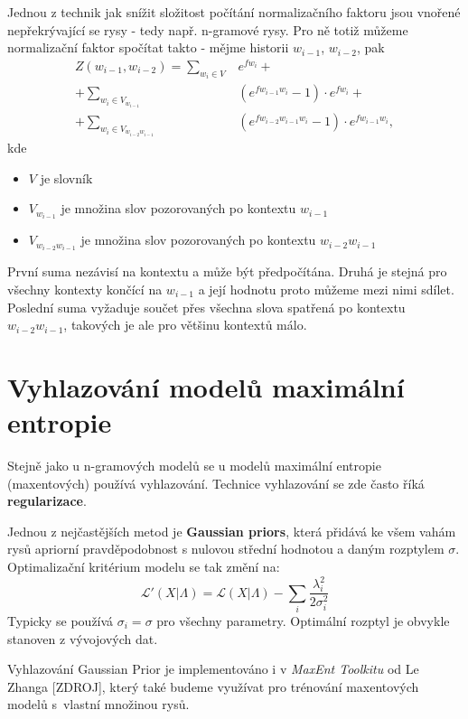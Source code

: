\documentclass[12pt,a4paper]{report}
\begin{document}
Jednou z technik jak snížit složitost počítání normalizačního faktoru jsou vnořené nepřekrývající se rysy - tedy např. n-gramové rysy. Pro ně totiž můžeme normalizační faktor spočítat takto - mějme historii $w_{i-1}$, $w_{i-2}$, pak
\begin{equation}
\begin{split}
Z(w_{i-1}, w_{i-2}) = \sum_{w_i \in V} & e^{fw_i} + \\ 
+ \sum_{w_i \in V_{w_{i-1}}} & (e^{fw_{i-1}w_i} - 1) \cdot e^{fw_i} + \\
+ \sum_{w_i \in V_{w_{i-2} w_{i-1}}} & (e^{fw_{i-2}w_{i-1}w_i} -1) \cdot e^{fw_{i-1}w_i},
\end{split}
\end{equation}
kde \begin{itemize}
\item{$V$ je slovník}
\item{$V_{w_{i-1}}$ je množina slov pozorovaných po kontextu $w_{i-1}$}
\item{$V_{w_{i-2}w_{i-1}}$ je množina slov pozorovaných po kontextu $w_{i-2}w_{i-1}$}
\end{itemize}
První suma nezávisí na kontextu a může být předpočítána. Druhá je stejná pro všechny kontexty končící na $w_{i-1}$ a její hodnotu proto můžeme mezi nimi sdílet. Poslední suma vyžaduje součet přes všechna slova spatřená po kontextu $w_{i-2}w_{i-1}$, takových je ale pro většinu kontextů málo.

\section{Vyhlazování modelů maximální entropie}

Stejně jako u n-gramových modelů se u modelů maximální entropie (maxentových) používá vyhlazování. Technice vyhlazování se zde často říká \textbf{regularizace}. 

Jednou z nejčastějších metod je \textbf{Gaussian priors}, která přidává ke všem vahám rysů apriorní pravděpodobnost s nulovou střední hodnotou a daným rozptylem $\sigma$. Optimalizační kritérium modelu se tak změní na:
\begin{equation}
\mathcal{L}'(X|\Lambda) = \mathcal{L}(X|\Lambda) - \sum_i \frac{\lambda_i^2}{2\sigma_i^2}
\end{equation}
Typicky se používá $\sigma_i = \sigma$ pro všechny parametry. Optimální rozptyl je obvykle stanoven z vývojových dat.

Vyhlazování Gaussian Prior je implementováno i v \textit{MaxEnt Toolkitu} od Le Zhanga [ZDROJ], který také budeme využívat pro trénování maxentových modelů s~vlastní množinou rysů.
\end{document}
